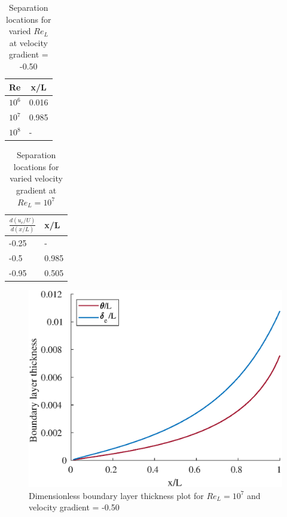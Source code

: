 


\begin{table}[H]
\centering
\begin{tabular}{l|l}
\hline
Re                    & \multicolumn{1}{c}{x/L} \\ \hline
$10^6$ & 0.016                   \\
$10^7$ & 0.985                   \\
$10^8$ & -                       \\ \hline
\end{tabular}
\caption{Separation locations for varied $Re_L$ at velocity gradient = -0.50}
\end{table}

\begin{table}[H]
\centering
\begin{tabular}{l|l}
\hline
$\frac{d(u_e/U)}{d(x/L)}$ & x/L   \\ \hline
-0.25 & -     \\
-0.5  & 0.985 \\
-0.95 & 0.505 \\ \hline
\end{tabular}
\caption{Separation locations for varied velocity gradient at $Re_L = 10^7$}
\end{table}

\begin{figure}[H]
\centering
\includegraphics[scale=0.8]{graphs/e5g1.eps}
\caption{Dimensionless boundary layer thickness plot for $Re_L = 10^7$ and velocity gradient = -0.50 }
\label{e1g1}
\end{figure}

